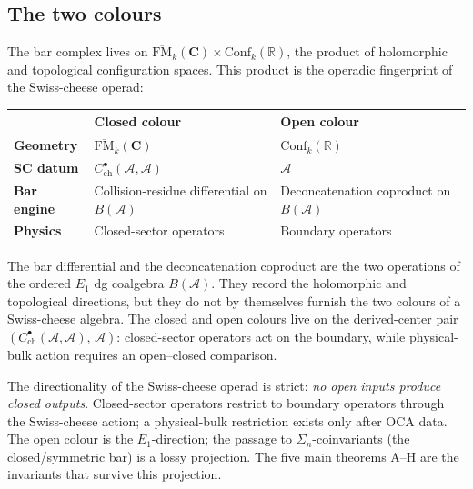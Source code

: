\documentclass[11pt,reqno]{amsart}
\theoremstyle{definition}
\theoremstyle{remark}
\providecommand{\cA}{\mathcal{A}}
\providecommand{\FM}{\overline{\mathrm{FM}}}
\providecommand{\Conf}{\mathrm{Conf}}
\renewcommand{\Bbbk}{\mathbf{C}}
\numberwithin{equation}{section}
\begin{document}
\subsection{The two colours}
\label{ssec:two-colours}

The bar complex lives on $\FM_k(\Bbbk) \times \Conf_k(\mathbb{R})$,
the product of holomorphic and topological configuration spaces.
This product is the operadic fingerprint of the Swiss-cheese
operad:

\begin{center}
\renewcommand{\arraystretch}{1.3}
\begin{tabular}{lll}
\toprule
& \textbf{Closed colour} & \textbf{Open colour} \\
\midrule
\textbf{Geometry} & $\FM_k(\Bbbk)$ & $\Conf_k(\mathbb{R})$ \\
\textbf{SC datum} & $C^\bullet_{\mathrm{ch}}(\cA,\cA)$ &
 $\cA$ \\
\textbf{Bar engine} & Collision-residue differential on $B(\cA)$ &
 Deconcatenation coproduct on $B(\cA)$ \\
\textbf{Physics} & Closed-sector operators & Boundary operators \\
\bottomrule
\end{tabular}
\end{center}

\noindent
The bar differential and the deconcatenation coproduct are the
two operations of the ordered $E_1$ dg coalgebra $B(\cA)$.
They record the holomorphic and topological directions, but
they do not by themselves furnish the two colours of a
Swiss-cheese algebra. The closed and open colours live on the
derived-center pair
$(C^\bullet_{\mathrm{ch}}(\cA,\cA),\,\cA)$:
closed-sector operators act on the boundary, while physical-bulk
action requires an open--closed comparison.

The directionality of the Swiss-cheese operad is strict:
\emph{no open inputs produce closed outputs}. Closed-sector operators
restrict to boundary operators through the Swiss-cheese action; a
physical-bulk restriction exists only after OCA data. The open
colour is the $E_1$-direction; the passage to
$\Sigma_n$-coinvariants (the closed/symmetric bar) is a lossy
projection. The five main theorems A--H are the invariants
that survive this projection.

\end{document}
